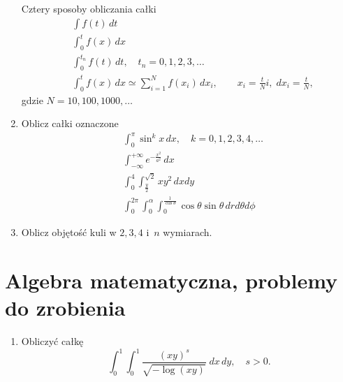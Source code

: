 \documentclass[a4paper,11pt]{article}
\begin{document}
\begin{enumerate}
  Cztery sposoby obliczania całki
  \begin{align}
    &\int f( t ) \, dt \\
    &\int_{ 0 }^{ t } f( x ) \, dx \\
    &\int_{ 0 }^{ t_{ n } } f( t ) \, dt, \quad
      t_{ n } = 0, 1, 2, 3, \ldots \\
    &\int_{ 0 }^{ t } f( x ) \, dx \simeq \sum_{ i = 1 }^{ N } f( x_{ i } ) \, dx_{ i },
      \qquad
      x_{ i } = \frac{ t }{ N } i, \; dx_{ i } = \frac{ t }{ N },
  \end{align}
  gdzie $N = 10, 100, 1000, \ldots$

\item Oblicz całki oznaczone
  \begin{align}
    &\int_{ 0 }^{ \pi } \sin^{ k } x \, dx, \quad
      k = 0, 1, 2, 3, 4, \ldots \\
    &\int_{ -\infty }^{ +\infty } e^{ -\frac{ x^{ 2 } }{ a^{ 2 } } } \, dx \\
    &\int_{ 0 }^{ 4 } \int_{ \frac{ y }{ 2 } }^{ \sqrt{ 2 } } x y^{ 2 } \, dx dy \\
    &\int_{ 0 }^{ 2\pi } \int_{ 0 }^{ \alpha } \int_{ 0 }^{ \frac{ 1 }{ \cos \theta } } \cos\theta \sin\theta \,
      dr d\theta d\phi
  \end{align}

\item Oblicz objętość kuli w $2, 3, 4$ i~$n$ wymiarach.

\end{enumerate}










\section{Algebra matematyczna, problemy do zrobienia}





\begin{enumerate}

\item Obliczyć całkę
  \begin{equation}
    \label{eq:Calculus-01}
    \int_{ 0 }^{ 1 } \int_{ 0 }^{ 1 } \frac{ ( x y )^{ s } }{ \sqrt{-\log( x y ) } }
      \; dx \, dy, \quad
      s > 0.
  \end{equation}



\end{enumerate}
\end{document}
